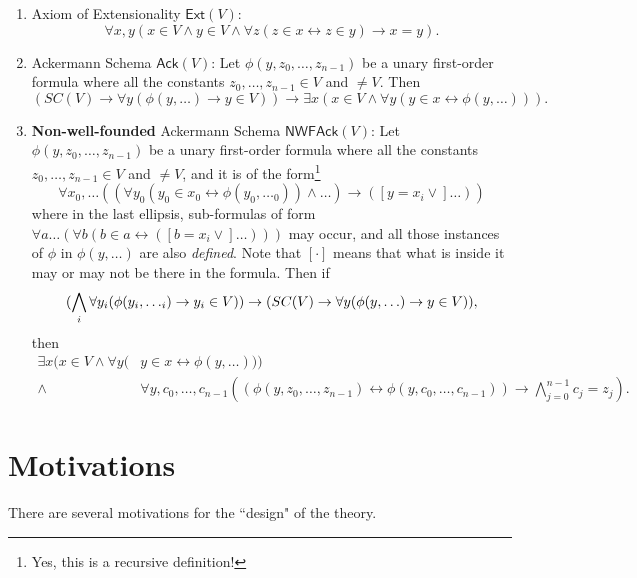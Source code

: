 \documentclass{article}
\begin{document}
\begin{enumerate}
    \item Axiom of Extensionality $\textsf{Ext}(V)$: $$\forall x, y (x \in V \wedge y \in V \wedge \forall z(z\in x \leftrightarrow z \in y) \rightarrow x = y).$$
    \item Ackermann Schema $\textsf{Ack}(V)$: Let $\phi(y, z_0, \ldots, z_{n-1})$ be a unary first-order formula where all the constants $z_0, \ldots, z_{n-1} \in V$ and $\ne V$. Then $$(SC(V) \rightarrow \forall y(\phi(y, \ldots) \rightarrow y \in V)) \rightarrow \exists x(x \in V \wedge \forall y(y \in x \leftrightarrow \phi(y, \ldots))).$$
    \item \textbf{Non-well-founded} Ackermann Schema $\textsf{NWFAck}(V)$: Let $\phi(y, z_0, \ldots, z_{n-1})$ be a unary first-order formula where all the constants $z_0, \ldots, z_{n-1} \in V$ and $\ne V$, and it is of the form\footnote{Yes, this is a recursive definition!}
$$\forall x_0, \ldots ((\forall y_0(y_0 \in x_0 \leftrightarrow \phi(y_0, \ldots_0)) \wedge \ldots) \rightarrow ([y = x_i \vee] \ldots))$$
where in the last ellipsis, sub-formulas of form $\forall a \ldots (\forall b (b \in a \leftrightarrow ([b = x_i \vee] \ldots)))$ may occur, and all those instances of $\phi$ in $\phi(y, \ldots)$ are also \textit{defined}. Note that $[\cdot]$ means that what is inside it may or may not be there in the formula. Then if 
$$(\bigwedge_i \forall y_i( \phi(y_i, \ldots_i) \rightarrow y_i \in V)) \rightarrow \\ (SC(V) \rightarrow \forall y(\phi(y, \ldots) \rightarrow y \in V)),$$
then
\begin{align*}
    \exists x(x \in V \wedge \forall y(&y \in x \leftrightarrow \phi(y, \ldots))) \\ \wedge\ &\forall y, c_0, \ldots, c_{n-1} ((\phi(y, z_0, \ldots, z_{n-1}) \leftrightarrow \phi(y, c_0, \ldots, c_{n-1})) \rightarrow \bigwedge_{j=0}^{n-1} {c_j = z_j}).
\end{align*}
\end{enumerate}

\section{Motivations}
There are several motivations for the ``design" of the theory.\\
\end{document}
